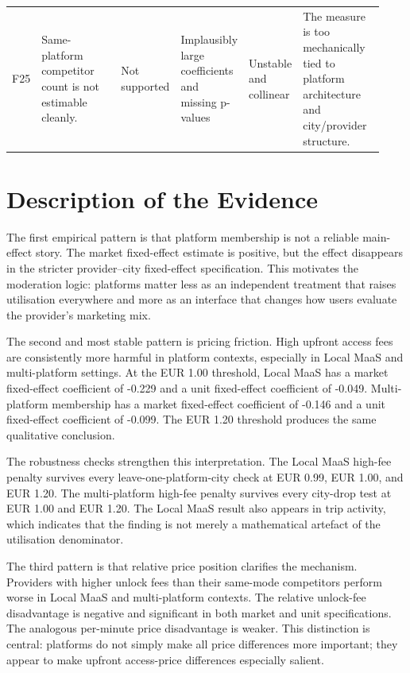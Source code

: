 \documentclass[11pt]{article}
\begin{document}
\begin{longtable}{p{0.075\linewidth}p{0.245\linewidth}p{0.115\linewidth}p{0.13\linewidth}p{0.13\linewidth}p{0.235\linewidth}}
F25 & Same-platform competitor count is not estimable cleanly. &
Not supported &
Implausibly large coefficients and missing p-values &
Unstable and collinear &
The measure is too mechanically tied to platform architecture and city/provider structure. \\

\end{longtable}
\normalsize

\section{Description of the Evidence}

The first empirical pattern is that platform membership is not a reliable main-effect
story. The market fixed-effect estimate is positive, but the effect disappears in the
stricter provider--city fixed-effect specification. This motivates the moderation logic:
platforms matter less as an independent treatment that raises utilisation everywhere and
more as an interface that changes how users evaluate the provider's marketing mix.

The second and most stable pattern is pricing friction. High upfront access fees are
consistently more harmful in platform contexts, especially in Local MaaS and multi-platform
settings. At the EUR 1.00 threshold, Local MaaS has a market fixed-effect coefficient of
-0.229 and a unit fixed-effect coefficient of -0.049. Multi-platform membership has a
market fixed-effect coefficient of -0.146 and a unit fixed-effect coefficient of -0.099.
The EUR 1.20 threshold produces the same qualitative conclusion.

The robustness checks strengthen this interpretation. The Local MaaS high-fee penalty
survives every leave-one-platform-city check at EUR 0.99, EUR 1.00, and EUR 1.20. The
multi-platform high-fee penalty survives every city-drop test at EUR 1.00 and EUR 1.20.
The Local MaaS result also appears in trip activity, which indicates that the finding is
not merely a mathematical artefact of the utilisation denominator.

The third pattern is that relative price position clarifies the mechanism. Providers with
higher unlock fees than their same-mode competitors perform worse in Local MaaS and
multi-platform contexts. The relative unlock-fee disadvantage is negative and significant
in both market and unit specifications. The analogous per-minute price disadvantage is
weaker. This distinction is central: platforms do not simply make all price differences
more important; they appear to make upfront access-price differences especially salient.
\end{document}
